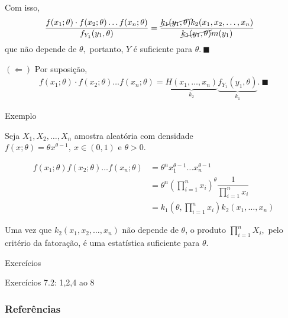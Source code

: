 \documentclass[12pt]{beamer}
\begin{document}
\begin{frame}{}
\begin{block}{}
\justifying
Com isso, 
\begin{align*}
    \dfrac{f(x_{1}; \theta) \cdot f(x_{2}; \theta) \ldots f(x_{n}; \theta)}{f_{Y_{1}}(y_{1},\theta)}&=\dfrac{\cancel{k_{1}(y_{1},\theta)}k_{2}(x_1, x_2, \ldots, x_n)}{\cancel{k_{1}(y_{1},\theta)}m(y_{1})}
\end{align*}
que não depende de $\theta,$ portanto, $Y$ é suficiente para $\theta.~\blacksquare$
\end{block}
\end{frame}

\begin{frame}{}
\begin{block}{$(\Leftarrow{})$}
\justifying
Por suposição,
\begin{align*}
    f(x_{1}; \theta) \cdot f(x_{2}; \theta) \ldots f(x_{n}; \theta)=\underbrace{H(x_{1},\ldots, x_{n})}_{k_{2}}\underbrace{f_{Y_{1}}(y_{1},\theta)}_{k_{1}}.~\blacksquare
\end{align*}
\end{block}
\end{frame}

\begin{frame}{Exemplo}
\begin{block}{}
\justifying
Seja $X_1, X_2, \ldots, X_n$ amostra aleatória com densidade 
$f(x; \theta) =\theta x^{\theta-1},~x\in (0,1)$ e $\theta>0.$

\begin{align*}
f(x_{1}; \theta) f(x_{2}; \theta) \ldots f(x_{n}; \theta)&=\theta^{n}x_{1}^{\theta-1} \ldots x_{n}^{\theta-1}\\
&=\theta^{n}\left(\displaystyle{\prod_{i=1}^{n}} x_i\right)^{\theta}\dfrac{1}{\displaystyle{\prod_{i=1}^{n}} x_i}\\
&=k_{1}(\theta,\displaystyle{\prod_{i=1}^{n}} x_i)k_{2}(x_{1},\ldots, x_{n})
\end{align*}

Uma vez que $k_2(x_1, x_2, \ldots, x_n)$ não depende de $\theta$, o produto $\prod_{i=1}^n X_i,$ pelo critério da fatoração, é uma estatística suficiente para $\theta$.
\end{block}
\end{frame}

\begin{frame}{Exercícios}
\begin{block}{\Home}
\justifying
Exercícios 7.2: 1,2,4 ao 8
\nocite{hogg, casella2021statistical, bolfarine}
\end{block}
\end{frame}

\begin{frame}[allowframebreaks]
\frametitle{\bf Referências}
\printbibliography
\end{frame}
\end{document}
